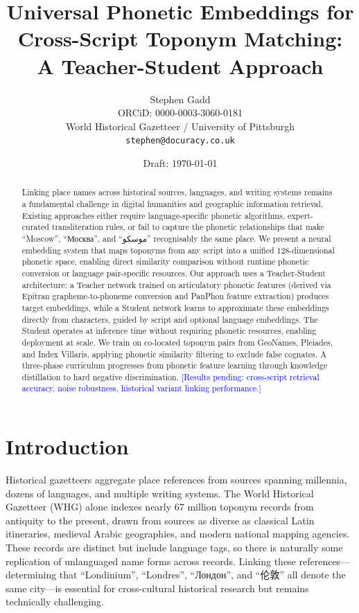 \documentclass[11pt,a4paper]{article}
\title{Universal Phonetic Embeddings for Cross-Script Toponym Matching:\\A Teacher-Student Approach}
\author{
    Stephen Gadd \\
    {\small ORCiD: 0000-0003-3060-0181} \\
    World Historical Gazetteer / University of Pittsburgh \\
    \texttt{stephen@docuracy.co.uk}
}
\date{Draft: \today}
\newcommand{\placeholder}[1]{\textcolor{blue}{[#1]}}
\newcommand{\embdim}{128}
\begin{document}
\maketitle

\begin{abstract}
Linking place names across historical sources, languages, and writing systems remains a fundamental challenge in digital humanities and geographic information retrieval. Existing approaches either require language-specific phonetic algorithms, expert-curated transliteration rules, or fail to capture the phonetic relationships that make ``Moscow'', ``Москва'', and ``موسکو'' recognisably the same place. We present a neural embedding system that maps toponyms from any script into a unified \embdim-dimensional phonetic space, enabling direct similarity comparison without runtime phonetic conversion or language pair-specific resources. Our approach uses a Teacher-Student architecture: a Teacher network trained on articulatory phonetic features (derived via Epitran grapheme-to-phoneme conversion and PanPhon feature extraction) produces target embeddings, while a Student network learns to approximate these embeddings directly from characters, guided by script and optional language embeddings. The Student operates at inference time without requiring phonetic resources, enabling deployment at scale. We train on co-located toponym pairs from GeoNames, Pleiades, and Index Villaris, applying phonetic similarity filtering to exclude false cognates. A three-phase curriculum progresses from phonetic feature learning through knowledge distillation to hard negative discrimination. \placeholder{Results pending: cross-script retrieval accuracy, noise robustness, historical variant linking performance.}
\end{abstract}

\section{Introduction}
\label{sec:introduction}

Historical gazetteers aggregate place references from sources spanning millennia, dozens of languages, and multiple writing systems. The World Historical Gazetteer (WHG) alone indexes nearly 67 million toponym records from antiquity to the present, drawn from sources as diverse as classical Latin itineraries, medieval Arabic geographies, and modern national mapping agencies. These records are distinct but include language tags, so there is naturally some replication of unlanguaged name forms across records. Linking these references---determining that ``Londinium'', ``Londres'', ``Лондон'', and ``伦敦'' all denote the same city---is essential for cross-cultural historical research but remains technically challenging.
\end{document}
